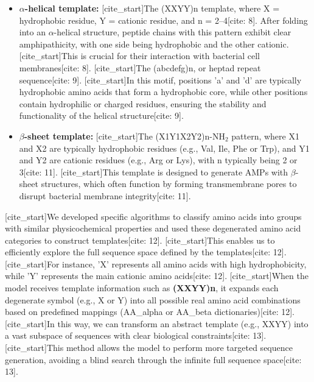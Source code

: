 \documentclass{article}
\begin{document}
\begin{itemize}
    \item \textbf{$\alpha$-helical template:}
    [cite_start]The (XXYY)n template, where X = hydrophobic residue, Y = cationic residue, and n = 2–4[cite: 8]. After folding into an $\alpha$-helical structure, peptide chains with this pattern exhibit clear amphipathicity, with one side being hydrophobic and the other cationic. [cite_start]This is crucial for their interaction with bacterial cell membranes[cite: 8].
    [cite_start]The (abcdefg)n, or heptad repeat sequence[cite: 9]. [cite_start]In this motif, positions 'a' and 'd' are typically hydrophobic amino acids that form a hydrophobic core, while other positions contain hydrophilic or charged residues, ensuring the stability and functionality of the helical structure[cite: 9].
    \item \textbf{$\beta$-sheet template:}
    [cite_start]The (X1Y1X2Y2)n-NH$_2$ pattern, where X1 and X2 are typically hydrophobic residues (e.g., Val, Ile, Phe or Trp), and Y1 and Y2 are cationic residues (e.g., Arg or Lys), with n typically being 2 or 3[cite: 11]. [cite_start]This template is designed to generate AMPs with $\beta$-sheet structures, which often function by forming transmembrane pores to disrupt bacterial membrane integrity[cite: 11].
\end{itemize}

[cite_start]We developed specific algorithms to classify amino acids into groups with similar physicochemical properties and used these degenerated amino acid categories to construct templates[cite: 12]. [cite_start]This enables us to efficiently explore the full sequence space defined by the templates[cite: 12]. [cite_start]For instance, 'X' represents all amino acids with high hydrophobicity, while 'Y' represents the main cationic amino acids[cite: 12]. [cite_start]When the model receives template information such as \textbf{(XXYY)n}, it expands each degenerate symbol (e.g., X or Y) into all possible real amino acid combinations based on predefined mappings (AA\_alpha or AA\_beta dictionaries)[cite: 12]. [cite_start]In this way, we can transform an abstract template (e.g., XXYY) into a vast subspace of sequences with clear biological constraints[cite: 13]. [cite_start]This method allows the model to perform more targeted sequence generation, avoiding a blind search through the infinite full sequence space[cite: 13].
\end{document}
